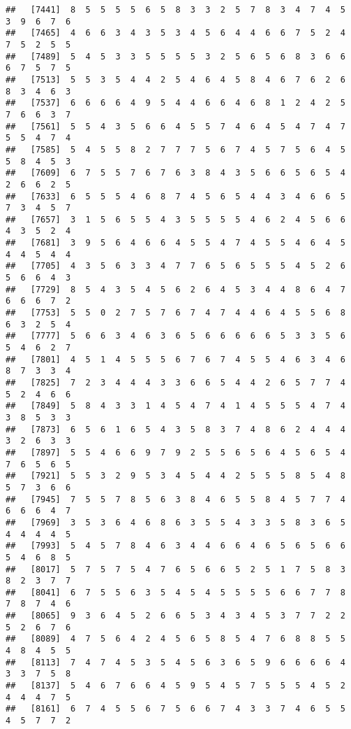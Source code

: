 \documentclass[
]{book}
\begin{document}
\begin{verbatim}
##   [7441]  8  5  5  5  5  6  5  8  3  3  2  5  7  8  3  4  7  4  5  3  9  6  7  6
##   [7465]  4  6  6  3  4  3  5  3  4  5  6  4  4  6  6  7  5  2  4  7  5  2  5  5
##   [7489]  5  4  5  3  3  5  5  5  5  3  2  5  6  5  6  8  3  6  6  6  7  5  7  5
##   [7513]  5  5  3  5  4  4  2  5  4  6  4  5  8  4  6  7  6  2  6  8  3  4  6  3
##   [7537]  6  6  6  6  4  9  5  4  4  6  6  4  6  8  1  2  4  2  5  7  6  6  3  7
##   [7561]  5  5  4  3  5  6  6  4  5  5  7  4  6  4  5  4  7  4  7  5  5  4  7  4
##   [7585]  5  4  5  5  8  2  7  7  7  5  6  7  4  5  7  5  6  4  5  5  8  4  5  3
##   [7609]  6  7  5  5  7  6  7  6  3  8  4  3  5  6  6  5  6  5  4  2  6  6  2  5
##   [7633]  6  5  5  5  4  6  8  7  4  5  6  5  4  4  3  4  6  6  5  7  3  4  5  7
##   [7657]  3  1  5  6  5  5  4  3  5  5  5  5  4  6  2  4  5  6  6  4  3  5  2  4
##   [7681]  3  9  5  6  4  6  6  4  5  5  4  7  4  5  5  4  6  4  5  4  4  5  4  4
##   [7705]  4  3  5  6  3  3  4  7  7  6  5  6  5  5  5  4  5  2  6  5  6  6  4  3
##   [7729]  8  5  4  3  5  4  5  6  2  6  4  5  3  4  4  8  6  4  7  6  6  6  7  2
##   [7753]  5  5  0  2  7  5  7  6  7  4  7  4  4  6  4  5  5  6  8  6  3  2  5  4
##   [7777]  5  6  6  3  4  6  3  6  5  6  6  6  6  6  5  3  3  5  6  5  4  6  2  7
##   [7801]  4  5  1  4  5  5  5  6  7  6  7  4  5  5  4  6  3  4  6  8  7  3  3  4
##   [7825]  7  2  3  4  4  4  3  3  6  6  5  4  4  2  6  5  7  7  4  5  2  4  6  6
##   [7849]  5  8  4  3  3  1  4  5  4  7  4  1  4  5  5  5  4  7  4  3  8  5  3  3
##   [7873]  6  5  6  1  6  5  4  3  5  8  3  7  4  8  6  2  4  4  4  3  2  6  3  3
##   [7897]  5  5  4  6  6  9  7  9  2  5  5  6  5  6  4  5  6  5  4  7  6  5  6  5
##   [7921]  5  5  3  2  9  5  3  4  5  4  4  2  5  5  5  8  5  4  8  5  7  3  6  6
##   [7945]  7  5  5  7  8  5  6  3  8  4  6  5  5  8  4  5  7  7  4  6  6  6  4  7
##   [7969]  3  5  3  6  4  6  8  6  3  5  5  4  3  3  5  8  3  6  5  4  4  4  4  5
##   [7993]  5  4  5  7  8  4  6  3  4  4  6  6  4  6  5  6  5  6  6  5  4  6  8  5
##   [8017]  5  7  5  7  5  4  7  6  5  6  6  5  2  5  1  7  5  8  3  8  2  3  7  7
##   [8041]  6  7  5  5  6  3  5  4  5  4  5  5  5  5  6  6  7  7  8  7  8  7  4  6
##   [8065]  9  3  6  4  5  2  6  6  5  3  4  3  4  5  3  7  7  2  2  5  2  6  7  6
##   [8089]  4  7  5  6  4  2  4  5  6  5  8  5  4  7  6  8  8  5  5  4  8  4  5  5
##   [8113]  7  4  7  4  5  3  5  4  5  6  3  6  5  9  6  6  6  6  4  3  3  7  5  8
##   [8137]  5  4  6  7  6  6  4  5  9  5  4  5  7  5  5  5  4  5  2  4  4  4  7  5
##   [8161]  6  7  4  5  5  6  7  5  6  6  7  4  3  3  7  4  6  5  5  4  5  7  7  2

\end{verbatim}
\end{document}
